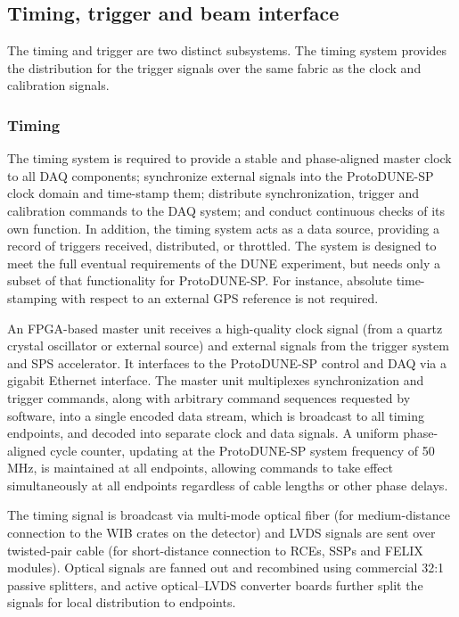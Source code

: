 \subsection{Timing, trigger and beam interface}
\label{sec:daq_time}

The timing and trigger are two distinct subsystems.  The timing
system provides the distribution for the trigger signals over the same
fabric as the clock and calibration signals.  %

\subsubsection{Timing}


The timing system is required to provide a stable and phase-aligned
master clock to all DAQ components; synchronize external signals into the
ProtoDUNE-SP clock domain and time-stamp them; distribute synchronization,
trigger and calibration commands to the DAQ system; and conduct continuous
checks of its own function. In addition, the timing system acts as a
data source, providing a record of triggers received, distributed, or
throttled. The system is designed to meet the full eventual requirements
of the DUNE experiment, but needs only a subset of that functionality
for ProtoDUNE-SP. For instance, absolute time-stamping with respect to an
external GPS reference is not required.

An FPGA-based master unit 
receives a high-quality clock signal 
(from a quartz crystal oscillator or external source) 
and external signals from the
trigger system and SPS accelerator. It interfaces to the ProtoDUNE-SP control
and DAQ via a gigabit Ethernet interface. The master unit multiplexes
synchronization and trigger commands, along with arbitrary command
sequences requested by software, into a single encoded data stream,
which is broadcast to all timing endpoints, and decoded into separate clock
and data signals. A uniform phase-aligned cycle counter, updating at the
ProtoDUNE-SP system frequency of 50\,MHz, is maintained at all endpoints,
allowing commands to take effect simultaneously at all endpoints
regardless of cable lengths or other phase delays.

The timing signal is broadcast via multi-mode optical fiber (for
medium-distance connection to the WIB crates on the detector) and LVDS
signals are sent over twisted-pair cable (for short-distance connection to RCEs,
SSPs and FELIX modules). Optical signals are fanned out and recombined
using commercial 32:1 passive splitters, and active optical--LVDS
converter boards further split the signals for local distribution to
endpoints. 

